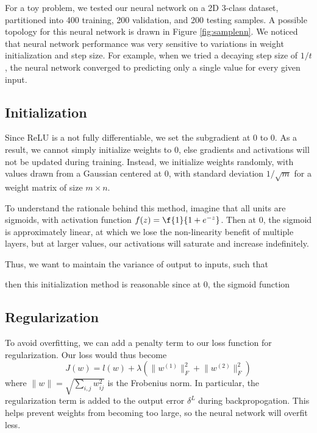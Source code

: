 \documentclass{article}
\begin{document}
\begin{multicols}{2}
For a toy problem, we tested our neural network on a 2D 3-class dataset,
partitioned into 400 training, 200 validation, and 200 testing samples.
A possible topology for this neural network is drawn in Figure \ref{fig:samplenn}.
We noticed that neural network performance was very sensitive to 
variations in weight initialization and step size.
For example, when we tried a decaying step size of $1/t$,
the neural network converged to predicting only a single value for every given input.

\subsection{Initialization}

Since ReLU is a not fully differentiable,
we set the subgradient at 0 to 0.
As a result, we cannot simply initialize weights to 0,
else gradients and activations
will not be updated during training.
Instead, we initialize weights randomly,
with values drawn from a Gaussian centered at 0,
with standard deviation $1/\sqrt{m}$
for a weight matrix of size $m\times n$.

To understand the rationale behind this method,
imagine that all units are sigmoids,
with activation function $f(z) = \f{1}{1+e^{-z}}$.
Then at 0, the sigmoid is approximately linear,
at which we lose the non-linearity benefit of multiple layers,
but at larger values,
our activations will saturate and increase indefinitely.

Thus, we want to maintain the variance of output to inputs, such that 

then this initialization method is reasonable
since at 0, the sigmoid function  

\subsection{Regularization}

To avoid overfitting, we can add a penalty term to our loss function for regularization.
Our loss would thus become
\begin{equation}
    J(w) = l(w) +
      \lambda(\lVert w^{(1)} \rVert^2_F + \lVert w^{(2)} \rVert^2_F)
\end{equation}
where $\lVert w\rVert = \sqrt{\sum_{i,j}{w_{ij}^2}}$ is the Frobenius norm.
In particular, the regularization term is added to the output error $\delta^L$
during backpropogation.
This helps prevent weights from becoming too large, so the neural network will
overfit less.


\end{multicols}
\end{document}
